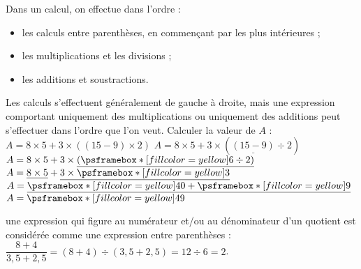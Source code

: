 \bigskip

\begin{methode}
   Dans un calcul, on effectue dans l'ordre :
   \begin{itemize}
      \item les calculs entre parenthèses, en commençant par les plus intérieures ;
      \item les multiplications et les divisions ;
      \item les additions et soustractions.
   \end{itemize}
   Les calculs s'effectuent généralement de gauche à droite, mais une expression comportant uniquement des multiplications
   ou uniquement des additions peut s'effectuer dans l'ordre que l'on veut.
   \exercice
      Calculer la valeur de $A$ : \\
      $A =8\times5+3\times((15-9)\times2)$
   \correction
      $A =8\times5+3\times(\underline{(15-9)}\div2)$ \\
      $A =8\times5+3\times\underline{(\psframebox*[fillcolor=yellow]{6}\div2)}$ \\
      $A =\underline{8\times5}+\underline{3\times\psframebox*[fillcolor=yellow]{3}}$ \\
      $A =\underline{\psframebox*[fillcolor=yellow]{40}+\psframebox*[fillcolor=yellow]{9}}$ \\
      $A = \psframebox*[fillcolor=yellow]{49}$
\end{methode}

\begin{remarque}
   une expression qui figure au numérateur et/ou au dénominateur d'un quotient est considérée comme une expression entre parenthèses : \\
   $\dfrac{8+4}{3,5+2,5} = (8+4)\div(3,5+2,5) =12\div6 =2$.
\end{remarque}